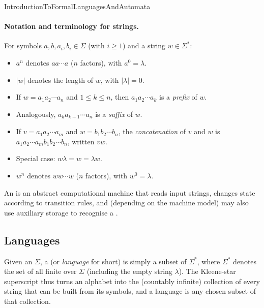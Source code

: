 \documentclass[hidelinks]{article}
\begin{document}
\begin{smodule}[title={Introduction to Formal Languages and Automata}]{IntroductionToFormalLanguagesAndAutomata}
\paragraph{Notation and terminology for strings.}
For symbols $a, b, a_i, b_i \in \Sigma$ (with $i \geq 1$) and a string $w \in \Sigma^*$:
\begin{itemize}
    \item $a^n$ denotes $a a \cdots a$ ($n$ factors), with $a^0 = \lambda$.
    \item $|w|$ denotes the length of $w$, with $|\lambda| = 0$.
    \item If $w = a_1 a_2 \cdots a_n$ and $1 \leq k \leq n$, then $a_1 a_2 \cdots a_k$ is a \emph{prefix} of $w$.
    \item Analogously, $a_k a_{k+1} \cdots a_n$ is a \emph{suffix} of $w$.
    \item If $v = a_1 a_2 \cdots a_m$ and $w = b_1 b_2 \cdots b_n$, the \emph{concatenation} of $v$ and $w$ is $a_1 a_2 \cdots a_m b_1 b_2 \cdots b_n$, written $vw$.
    \item Special case: $w \lambda = w = \lambda w$.
    \item $w^n$ denotes $w w \cdots w$ ($n$ factors), with $w^0 = \lambda$.
\end{itemize}

\begin{sdefinition}[for=automaton]
    An  is an abstract computational machine that reads input strings, changes state according to transition rules, and (depending on the machine model) may also use auxiliary storage to recognise a .
\end{sdefinition}

\subsection{Languages}

\begin{sdefinition}[for=formal language]
    Given an  $\Sigma$, a  (or \emph{language} for short) is simply a subset of $\Sigma^*$, where $\Sigma^*$ denotes the set of all finite  over $\Sigma$ (including the empty string $\lambda$). The Kleene-star superscript thus turns an alphabet into the (countably infinite) collection of every string that can be built from its symbols, and a language is any chosen subset of that collection.
\end{sdefinition}


\end{smodule}
\end{document}
